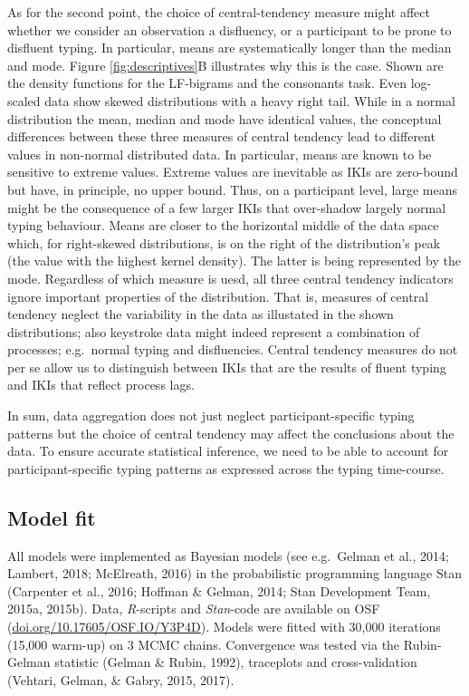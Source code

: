 \documentclass[
  english,
  man,mask,floatsintext]{apa7}
\begin{document}
As for the second point, the choice of central-tendency measure might affect whether we consider an observation a disfluency, or a participant to be prone to disfluent typing. In particular, means are systematically longer than the median and mode. Figure \ref{fig:descriptives}B illustrates why this is the case. Shown are the density functions for the LF-bigrams and the consonants task. Even log-scaled data show skewed distributions with a heavy right tail. While in a normal distribution the mean, median and mode have identical values, the conceptual differences between these three measures of central tendency lead to different values in non-normal distributed data. In particular, means are known to be sensitive to extreme values. Extreme values are inevitable as IKIs are zero-bound but have, in principle, no upper bound. Thus, on a participant level, large means might be the consequence of a few larger IKIs that over-shadow largely normal typing behaviour. Means are closer to the horizontal middle of the data space which, for right-skewed distributions, is on the right of the distribution's peak (the value with the highest kernel density). The latter is being represented by the mode. Regardless of which measure is uesd, all three central tendency indicators ignore important properties of the distribution. That is, measures of central tendency neglect the variability in the data as illustated in the shown distributions; also keystroke data might indeed represent a combination of processes; e.g.~normal typing and disfluencies. Central tendency measures do not per se allow us to distinguish between IKIs that are the results of fluent typing and IKIs that reflect process lags.

In sum, data aggregation does not just neglect participant-specific typing patterns but the choice of central tendency may affect the conclusions about the data. To ensure accurate statistical inference, we need to be able to account for participant-specific typing patterns as expressed across the typing time-course.

\hypertarget{model-fit}{%
\subsection{Model fit}\label{model-fit}}

All models were implemented as Bayesian models (see e.g.~Gelman et al., 2014; Lambert, 2018; McElreath, 2016) in the probabilistic programming language Stan (Carpenter et al., 2016; Hoffman \& Gelman, 2014; Stan Development Team, 2015a, 2015b). Data, \textit{R}-scripts and \textit{Stan}-code are available on OSF (\href{https://doi.org/10.17605/OSF.IO/Y3P4D}{doi.org/10.17605/OSF.IO/Y3P4D}). Models were fitted with 30,000 iterations (15,000 warm-up) on 3 MCMC chains. Convergence was tested via the Rubin-Gelman statistic (Gelman \& Rubin, 1992), traceplots and cross-validation (Vehtari, Gelman, \& Gabry, 2015, 2017).
\end{document}

